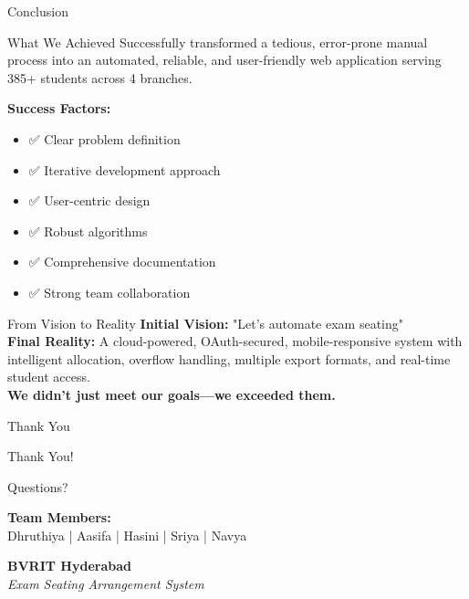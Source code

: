 \documentclass[aspectratio=169]{beamer}
\begin{document}
\begin{frame}{Conclusion}
\begin{block}{What We Achieved}
Successfully transformed a tedious, error-prone manual process into an automated, reliable, and user-friendly web application serving 385+ students across 4 branches.
\end{block}

\vspace{0.3cm}
\textbf{Success Factors:}
\begin{itemize}
    \item ✅ Clear problem definition
    \item ✅ Iterative development approach
    \item ✅ User-centric design
    \item ✅ Robust algorithms
    \item ✅ Comprehensive documentation
    \item ✅ Strong team collaboration
\end{itemize}

\vspace{0.3cm}
\begin{alertblock}{From Vision to Reality}
\textbf{Initial Vision:} "Let's automate exam seating"\\
\textbf{Final Reality:} A cloud-powered, OAuth-secured, mobile-responsive system with intelligent allocation, overflow handling, multiple export formats, and real-time student access.\\
\vspace{0.2cm}
\textbf{We didn't just meet our goals—we exceeded them.}
\end{alertblock}
\end{frame}

\begin{frame}{Thank You}
\begin{center}
\Huge Thank You!

\vspace{1cm}
\Large Questions?

\vspace{1cm}
\normalsize
\textbf{Team Members:}\\
Dhruthiya | Aasifa | Hasini | Sriya | Navya

\vspace{0.5cm}
\textbf{BVRIT Hyderabad}\\
\textit{Exam Seating Arrangement System}
\end{center}
\end{frame}
\end{document}
